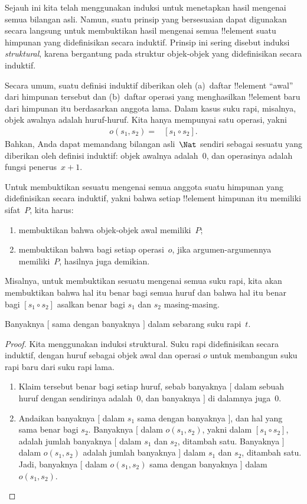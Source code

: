 \documentclass[../../../include/open-logic-section]{subfiles}
\begin{document}


Sejauh ini kita telah menggunakan induksi untuk menetapkan hasil mengenai
semua bilangan asli. Namun, suatu prinsip yang bersesuaian dapat digunakan
secara langsung untuk membuktikan hasil mengenai semua !!{element} suatu
himpunan yang didefinisikan secara induktif. Prinsip ini sering disebut
induksi \emph{struktural}, karena bergantung pada struktur objek-objek yang
didefinisikan secara induktif.

Secara umum, suatu definisi induktif diberikan oleh (a)~daftar !!{element}
``awal'' dari himpunan tersebut dan (b)~daftar operasi yang menghasilkan
!!{element} baru dari himpunan itu berdasarkan anggota lama. Dalam kasus
suku rapi, misalnya, objek awalnya adalah huruf-huruf. Kita hanya mempunyai
satu operasi, yakni
\begin{align*}
  o(s_1, s_2) = & [s_1 \circ s_2].
\end{align*}
Bahkan, Anda dapat memandang bilangan asli~$\Nat$ sendiri sebagai sesuatu
yang diberikan oleh definisi induktif: objek awalnya adalah~$0$, dan
operasinya adalah fungsi penerus~$x + 1$.

Untuk membuktikan sesuatu mengenai semua anggota suatu himpunan yang
didefinisikan secara induktif, yakni bahwa setiap !!{element} himpunan itu
memiliki sifat~$P$, kita harus:
\begin{enumerate}
\item membuktikan bahwa objek-objek awal memiliki~$P$;
\item membuktikan bahwa bagi setiap operasi~$o$, jika argumen-argumennya
  memiliki~$P$, hasilnya juga demikian.
\end{enumerate}
Misalnya, untuk membuktikan sesuatu mengenai semua suku rapi, kita akan
membuktikan bahwa hal itu benar bagi semua huruf dan bahwa hal itu benar
bagi $[s_1 \circ s_2]$ asalkan benar bagi $s_1$ dan $s_2$ masing-masing.

\begin{prop}
  Banyaknya $[$ sama dengan banyaknya $]$ dalam sebarang suku rapi~$t$.
\end{prop}

\begin{proof}
Kita menggunakan induksi struktural. Suku rapi didefinisikan secara
induktif, dengan huruf sebagai objek awal dan operasi $o$ untuk membangun
suku rapi baru dari suku rapi lama.
\begin{enumerate}
\item Klaim tersebut benar bagi setiap huruf, sebab banyaknya $[$ dalam
  sebuah huruf dengan sendirinya adalah~$0$, dan banyaknya $]$ di dalamnya
  juga~$0$.
\item Andaikan banyaknya $[$ dalam $s_1$ sama dengan banyaknya $]$, dan hal
  yang sama benar bagi $s_2$. Banyaknya $[$ dalam $o(s_1, s_2)$, yakni
  dalam $[s_1 \circ s_2]$, adalah jumlah banyaknya $[$ dalam $s_1$ dan
  $s_2$, ditambah satu. Banyaknya $]$ dalam $o(s_1, s_2)$ adalah jumlah
  banyaknya $]$ dalam $s_1$ dan $s_2$, ditambah satu. Jadi, banyaknya $[$
  dalam $o(s_1, s_2)$ sama dengan banyaknya $]$ dalam $o(s_1,s_2)$.
\end{enumerate}
\end{proof}
\end{document}
